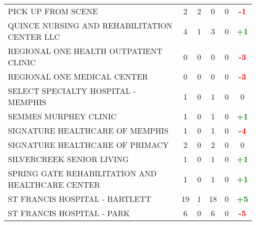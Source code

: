 \documentclass{article}
\begin{document}
\begin{longtable}{l|cccc|c}
    
        PICK UP FROM SCENE & 2 & 2 & 0 & 0 & \textcolor{red}{\textbf{-1}} \\
    

    
        QUINCE NURSING AND REHABILITATION CENTER LLC & 4 & 1 & 3 & 0 & \textcolor{green}{\textbf{+1}} \\
    

    
        REGIONAL ONE HEALTH OUTPATIENT CLINIC & 0 & 0 & 0 & 0 & \textcolor{red}{\textbf{-3}} \\
    

    
        REGIONAL ONE MEDICAL CENTER & 0 & 0 & 0 & 0 & \textcolor{red}{\textbf{-3}} \\
    

    
        SELECT SPECIALTY HOSPITAL - MEMPHIS & 1 & 0 & 1 & 0 & 0 \\
    

    
        SEMMES MURPHEY CLINIC & 1 & 0 & 1 & 0 & \textcolor{green}{\textbf{+1}} \\
    

    
        SIGNATURE HEALTHCARE OF MEMPHIS & 1 & 0 & 1 & 0 & \textcolor{red}{\textbf{-4}} \\
    

    
        SIGNATURE HEALTHCARE OF PRIMACY & 2 & 0 & 2 & 0 & 0 \\
    

    
        SILVERCREEK SENIOR LIVING & 1 & 0 & 1 & 0 & \textcolor{green}{\textbf{+1}} \\
    

    
        SPRING GATE REHABILITATION AND HEALTHCARE CENTER & 1 & 0 & 1 & 0 & \textcolor{green}{\textbf{+1}} \\
    

    
        ST FRANCIS HOSPITAL - BARTLETT & 19 & 1 & 18 & 0 & \textcolor{green}{\textbf{+5}} \\
    

    
        ST FRANCIS HOSPITAL - PARK & 6 & 0 & 6 & 0 & \textcolor{red}{\textbf{-5}} \\
    


\end{longtable}
\end{document}
